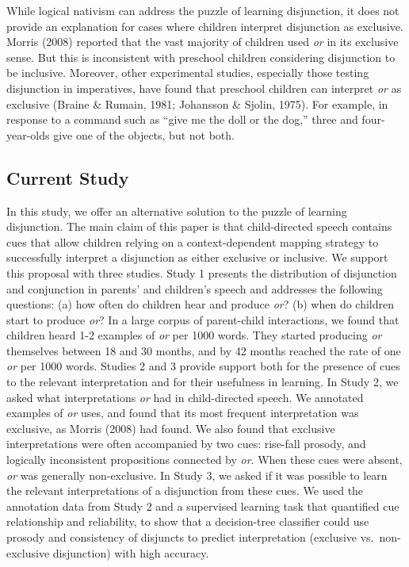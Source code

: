 \documentclass[
  english,
  ,man,floatsintext]{apa6}
\begin{document}
While logical nativism can address the puzzle of learning disjunction, it does not provide an explanation for cases where children interpret disjunction as exclusive. Morris (2008) reported that the vast majority of children used \emph{or} in its exclusive sense. But this is inconsistent with preschool children considering disjunction to be inclusive. Moreover, other experimental studies, especially those testing disjunction in imperatives, have found that preschool children can interpret \emph{or} as exclusive (Braine \& Rumain, 1981; Johansson \& Sjolin, 1975). For example, in response to a command such as ``give me the doll or the dog,'' three and four-year-olds give one of the objects, but not both.

\hypertarget{current-study}{%
\subsection{Current Study}\label{current-study}}

In this study, we offer an alternative solution to the puzzle of learning disjunction. The main claim of this paper is that child-directed speech contains cues that allow children relying on a context-dependent mapping strategy to successfully interpret a disjunction as either exclusive or inclusive. We support this proposal with three studies. Study 1 presents the distribution of disjunction and conjunction in parents' and children's speech and addresses the following questions: (a) how often do children hear and produce \emph{or}? (b) when do children start to produce \emph{or}? In a large corpus of parent-child interactions, we found that children heard 1-2 examples of \emph{or} per 1000 words. They started producing \emph{or} themselves between 18 and 30 months, and by 42 months reached the rate of one \emph{or} per 1000 words. Studies 2 and 3 provide support both for the presence of cues to the relevant interpretation and for their usefulness in learning. In Study 2, we asked what interpretations \emph{or} had in child-directed speech. We annotated examples of \emph{or} uses, and found that its most frequent interpretation was exclusive, as Morris (2008) had found. We also found that exclusive interpretations were often accompanied by two cues: rise-fall prosody, and logically inconsistent propositions connected by \emph{or}. When these cues were absent, \emph{or} was generally non-exclusive. In Study 3, we asked if it was possible to learn the relevant interpretations of a disjunction from these cues. We used the annotation data from Study 2 and a supervised learning task that quantified cue relationship and reliability, to show that a decision-tree classifier could use prosody and consistency of disjuncts to predict interpretation (exclusive vs.~non-exclusive disjunction) with high accuracy.
\end{document}

